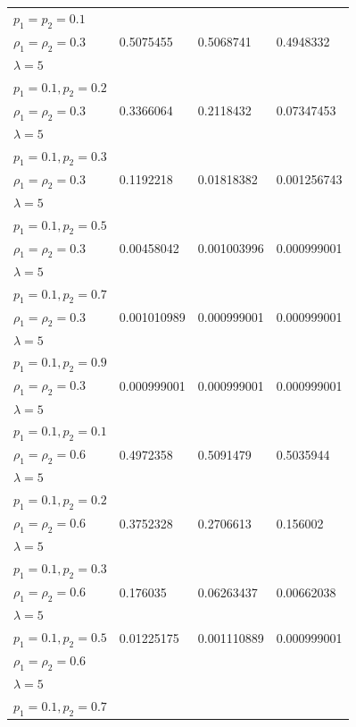 \documentclass[12pt,oneside]{report}
\theoremstyle{definition}
\theoremstyle{mystyle}
\begin{document}
\begin{landscape}
\begin{center}
\begin{longtable}{|l|l|l| l|}
		$ p_{1}=p_{2}=0.1 $ & &   & \\
		$ \rho_{1}=\rho_{2}=0.3 $ & 0.5075455 &0.5068741 &0.4948332 \\
		$\lambda=5$ &  &  &\\ \hline
		$ p_{1}=0.1,p_{2}=0.2 $  &  &  & \\
		$ \rho_{1}=\rho_{2}=0.3 $  &0.3366064  & 0.2118432&0.07347453 \\
		$\lambda=5$ &  &  &\\ \hline
		$ p_{1}=0.1,p_{2}=0.3 $ &  & &   \\
		$ \rho_{1}=\rho_{2}=0.3 $  &0.1192218  &0.01818382 &0.001256743 \\
		$\lambda=5$ &  & & \\ \hline
		$ p_{1}=0.1,p_{2}=0.5 $ & & & \\
		$ \rho_{1}=\rho_{2}=0.3 $&0.00458042&0.001003996&0.000999001\\
		$\lambda=5$ &  & & \\ \hline
		$ p_{1}=0.1,p_{2}=0.7 $ & & & \\
		$ \rho_{1}=\rho_{2}=0.3 $ &0.001010989  &0.000999001  &0.000999001\\
		$\lambda=5$ &  &  &\\ \hline
		$ p_{1}=0.1,p_{2}=0.9$ &  &   &\\
		$ \rho_{1}=\rho_{2}=0.3 $  & 0.000999001 & 0.000999001 &0.000999001\\
		$\lambda=5$ &  &  &\\ \hline
		$ p_{1}=0.1,p_{2}=0.1$ &  & &  \\
		$ \rho_{1}=\rho_{2}=0.6 $  &0.4972358  &0.5091479 &0.5035944\\
		$\lambda=5$ &  &  &\\ \hline
		$ p_{1}=0.1,p_{2}=0.2$ &  &   &  \\ 
		$ \rho_{1}=\rho_{2}=0.6 $  & 0.3752328  &0.2706613 & 0.156002\\
		$\lambda=5$ &  &  &\\ \hline
		$ p_{1}=0.1,p_{2}=0.3$&   &  & \\
		$ \rho_{1}=\rho_{2}=0.6 $  &0.176035  &0.06263437 &0.00662038 \\
		$\lambda=5$ &  &  &\\ \hline
		$ p_{1}=0.1,p_{2}=0.5$ &0.01225175   &0.001110889 & 0.000999001 \\
		$ \rho_{1}=\rho_{2}=0.6 $  &  & & \\
		$\lambda=5$ &  & & \\ \hline
		$ p_{1}=0.1,p_{2}=0.7$ &   & &  \\

\end{longtable}
\end{center}
\end{landscape}
\end{document}
